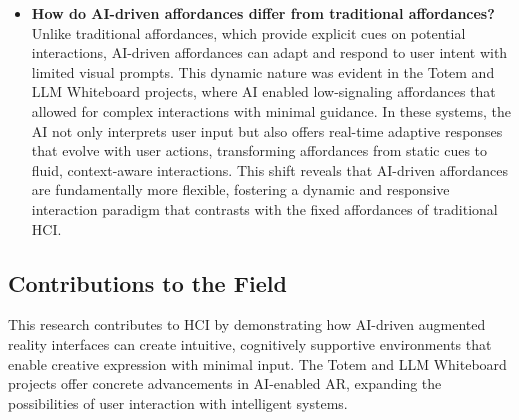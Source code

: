 \begin{itemize}
    \item \textbf{How do AI-driven affordances differ from traditional affordances?} Unlike traditional affordances, which provide explicit cues on potential interactions, AI-driven affordances can adapt and respond to user intent with limited visual prompts.
    This dynamic nature was evident in the Totem and LLM Whiteboard projects, where AI enabled low-signaling affordances that allowed for complex interactions with minimal guidance.
    In these systems, the AI not only interprets user input but also offers real-time adaptive responses that evolve with user actions, transforming affordances from static cues to fluid, context-aware interactions.
    This shift reveals that AI-driven affordances are fundamentally more flexible, fostering a dynamic and responsive interaction paradigm that contrasts with the fixed affordances of traditional HCI.
\end{itemize}


\subsection{Contributions to the Field}

This research contributes to HCI by demonstrating how AI-driven augmented reality interfaces can create intuitive, cognitively supportive environments that enable creative expression with minimal input.
The Totem and LLM Whiteboard projects offer concrete advancements in AI-enabled AR, expanding the possibilities of user interaction with intelligent systems.

